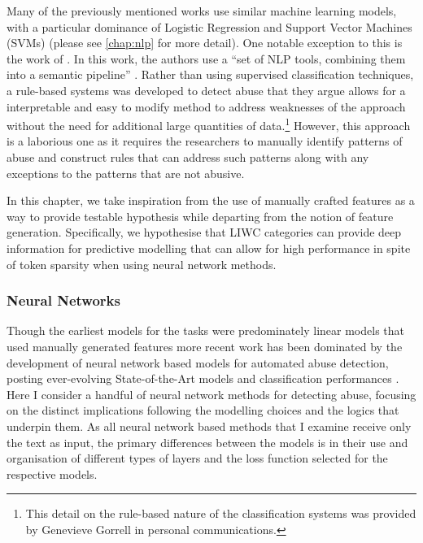 Many of the previously mentioned works use similar machine learning models, with a particular dominance of Logistic Regression and Support Vector Machines (SVMs) (please see \autoref{chap:nlp} for more detail). One notable exception to this is the work of \citet{Gorrell:2018}. In this work, the authors use a ``set of NLP tools, combining them into a semantic pipeline'' \citep[pp. 601]{Gorrell:2018}. Rather than using supervised classification techniques, a rule-based systems was developed to detect abuse that they argue allows for a interpretable and easy to modify method to address weaknesses of the approach without the need for additional large quantities of data.\footnote{This detail on the rule-based nature of the classification systems was provided by Genevieve Gorrell in personal communications.} However, this approach is a laborious one as it requires the researchers to manually identify patterns of abuse and construct rules that can address such patterns along with any exceptions to the patterns that are not abusive.
\vspace{5mm}

In this chapter, we take inspiration from the use of manually crafted features as a way to provide testable hypothesis while departing from the notion of feature generation. Specifically, we hypothesise that LIWC categories can provide deep information for predictive modelling that can allow for high performance in spite of token sparsity when using neural network methods.

\subsubsection{Neural Networks}\label{sec:liwc_nn}
Though the earliest models for the tasks were predominately linear models that used manually generated features \citep{Waseem-Hovy:2016,Davidson:2017,Warner:2012} more recent work has been dominated by the development of neural network based models for automated abuse detection, posting ever-evolving State-of-the-Art models and classification performances \citep[e.g.]{Park:2017,Badjatiya:2017,Zimmerman:2018,Stoop:2019,Isaksen:2020}. Here I consider a handful of neural network methods for detecting abuse, focusing on the distinct implications following the modelling choices and the logics that underpin them. As all neural network based methods that I examine receive only the text as input, the primary differences between the models is in their use and organisation of different types of layers and the loss function selected for the respective models.

